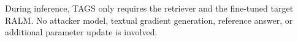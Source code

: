 \documentclass[11pt]{article}
\begin{document}
During inference, TAGS only requires the retriever and the fine-tuned target RALM.
No attacker model, textual gradient generation, reference answer, or additional parameter update is involved.






\end{document}

